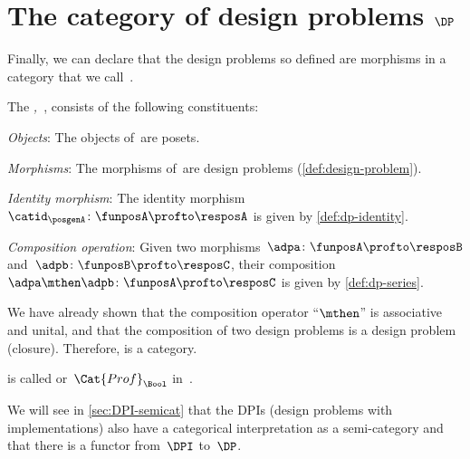 

\section{The category of design problems $\DP$}

Finally, we can declare that the design problems so defined are morphisms
in a category that we call~\iindex{\DP}.


\begin{definition}
    \label{def:DP}
    The \emph{,~\DP}, consists of the following constituents:
    \begin{compactenum}
        \item \emph{Objects}: The objects of~\DP are posets.
        \item \emph{Morphisms}: The morphisms of~\DP are design problems (\cref{def:design-problem}).
        \item \emph{Identity morphism}: The identity morphism~$\catid_\posgenA \colon \funposA \profto \resposA$ is given by \cref{def:dp-identity}.
        \item \emph{Composition operation}: Given two morphisms~$\adpa \colon  \funposA \profto \resposB$ and~$\adpb \colon \funposB \profto \resposC$, their
        composition~$\adpa \mthen \adpb\colon \funposA\profto \resposC$ is given by \cref{def:dp-series}.
    \end{compactenum}
\end{definition}

We have already shown that the composition operator ``$\mthen$'' is associative and unital, and that the composition of two design problems is a design problem (closure).
Therefore, \DP is a category.

\begin{remark}
    \DP is called \feas or~$\Cat{Prof}_\Bool$ in~\cite{fong2019}.
\end{remark}


\begin{remark}
    We will see in \cref{sec:DPI-semicat} that the DPIs (design problems with implementations) also have
    a categorical interpretation as a semi-category \DPI and that there is a functor from~$\DPI$ to~$\DP$.
\end{remark}
